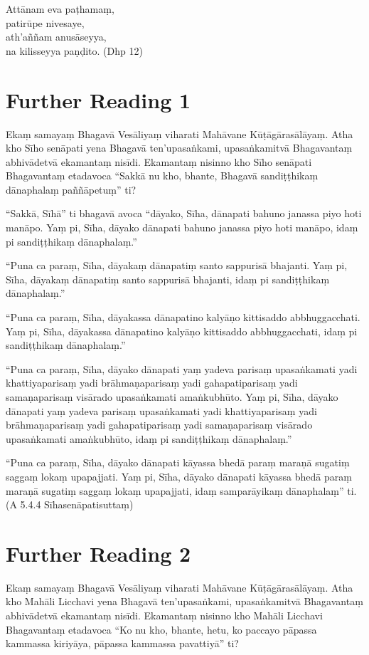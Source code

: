 Attānam eva paṭhamaṃ,\\
patirūpe nivesaye,\\
ath’aññam anusāseyya,\\
na kilisseyya paṇḍito. \hfill(Dhp 12)

\section*{Further Reading 1}

Ekaṃ samayaṃ Bhagavā Vesāliyaṃ viharati Mahāvane Kūṭāgārasālāyaṃ. Atha kho Sīho senāpati yena Bhagavā ten’upasaṅkami, upasaṅkamitvā Bhagavantaṃ abhivādetvā ekamantaṃ nisīdi. Ekamantaṃ nisinno kho Sīho senāpati Bhagavantaṃ etadavoca “Sakkā nu kho, bhante, Bhagavā sandiṭṭhikaṃ dānaphalaṃ paññāpetuṃ” ti?

“Sakkā, Sīhā” ti bhagavā avoca “dāyako, Sīha, dānapati bahuno janassa piyo hoti manāpo. Yaṃ pi, Sīha, dāyako dānapati bahuno janassa piyo hoti manāpo, idaṃ pi sandiṭṭhikaṃ dānaphalaṃ.”

“Puna ca paraṃ, Sīha, dāyakaṃ dānapatiṃ santo sappurisā bhajanti. Yaṃ pi, Sīha, dāyakaṃ dānapatiṃ santo sappurisā bhajanti, idaṃ pi sandiṭṭhikaṃ dānaphalaṃ.”

“Puna ca paraṃ, Sīha, dāyakassa dānapatino kalyāṇo kittisaddo abbhuggacchati. Yaṃ pi, Sīha, dāyakassa dānapatino kalyāṇo kittisaddo abbhuggacchati, idaṃ pi sandiṭṭhikaṃ dānaphalaṃ.”

“Puna ca paraṃ, Sīha, dāyako dānapati yaṃ yadeva parisaṃ upasaṅkamati yadi khattiyaparisaṃ yadi brāhmaṇaparisaṃ yadi gahapatiparisaṃ yadi samaṇaparisaṃ visārado upasaṅkamati amaṅkubhūto. Yaṃ pi, Sīha, dāyako dānapati yaṃ yadeva parisaṃ upasaṅkamati yadi khattiyaparisaṃ yadi brāhmaṇaparisaṃ yadi gahapatiparisaṃ yadi samaṇaparisaṃ visārado upasaṅkamati amaṅkubhūto, idaṃ pi sandiṭṭhikaṃ dānaphalaṃ.”

“Puna ca paraṃ, Sīha, dāyako dānapati kāyassa bhedā paraṃ maraṇā sugatiṃ saggaṃ lokaṃ upapajjati. Yaṃ pi, Sīha, dāyako dānapati kāyassa bhedā paraṃ maraṇā sugatiṃ saggaṃ lokaṃ upapajjati, idaṃ samparāyikaṃ dānaphalaṃ” ti. \hfill(A 5.4.4 Sīhasenāpatisuttaṃ)

\section*{Further Reading 2}

Ekaṃ samayaṃ Bhagavā Vesāliyaṃ viharati Mahāvane Kūṭāgārasālāyaṃ. Atha kho Mahāli Licchavi yena Bhagavā ten’upasaṅkami, upasaṅkamitvā Bhagavantaṃ abhivādetvā ekamantaṃ nisīdi. Ekamantaṃ nisinno kho Mahāli Licchavi Bhagavantaṃ etadavoca “Ko nu kho, bhante, hetu, ko paccayo pāpassa kammassa kiriyāya, pāpassa kammassa pavattiyā” ti?

